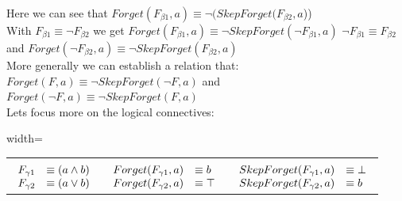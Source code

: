 Here we can see that $Forget(F_{\beta1},a) \equiv \neg(SkepForget(F_{\beta2},a$))\\
With $F_{\beta1} \equiv \neg F_{\beta2}$ we get $Forget(F_{\beta1},a) \equiv \neg SkepForget(\neg F_{\beta1},a)$
$\neg F_{\beta1} \equiv F_{\beta2}$ and $Forget(\neg F_{\beta2},a) \equiv \neg SkepForget(F_{\beta2},a)$\\
More generally we can establish a relation that: $Forget(F,a) \equiv \neg SkepForget(\neg F,a)$ and $Forget(\neg F,a) \equiv \neg SkepForget(F,a)$\\
Lets focus more on the logical connectives:\\
\begin{adjustbox}{width=\textwidth}
\begin{tabular}{ c  c  c }
 &  &  \\
$\begin{array}{l l}
F_{\gamma1} &\equiv (a \land b)\\
F_{\gamma2} &\equiv (a \lor b)\\
\end{array}$ & $\begin{array}{l l}
Forget(F_{\gamma1},a) &\equiv b\\
Forget(F_{\gamma2},a) &\equiv \top\\
\end{array}$ & $\begin{array}{l l}
SkepForget(F_{\gamma1},a) &\equiv \bot\\
SkepForget(F_{\gamma2},a) &\equiv b\\
\end{array}$\\
\end{tabular}
\end{adjustbox}\newline\newline

